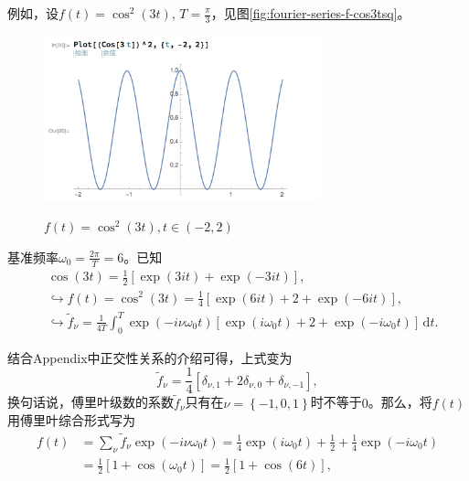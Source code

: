 例如，设$f(t) = \cos^{2} \left( 3 t \right), \, T = \frac{\pi}{3}$，见图\eqref{fig:fourier-series-f-cos3tsq}。

\begin{figure}[htbp]
   \caption{$f(t) = \cos^{2} \left( 3 t \right), t \in (-2, 2)$}
  \centering
  \includegraphics[width=8cm]{./Figures/20180305-cos3tsq.png}
  \label{fig:fourier-series-f-cos3tsq}
%
\end{figure}

基准频率$\omega_{0} = \frac{2 \pi}{T} = 6$。已知
\begin{equation}
  \label{eq:fourier-series-expo-coef}
\begin{split}
  & \cos \left( 3t \right) = \frac{1}{2} \left[
  \exp \left( 3 i t \right) + \exp \left( - 3 i t \right)
  \right], \\
  & \hookrightarrow
  f(t) = \cos^{2} (3t) = \frac{1}{4} \left[
  \exp \left( 6 i t \right) + 2 + \exp \left( - 6 i t \right)
  \right], \\
  & \hookrightarrow
  \tilde{f}_{\nu} = \frac{1}{4 T} \int_{0}^{T}
  \exp \left( -i \nu \omega_{0} t \right)
  \left[
  \exp \left( i \omega_{0} t \right) + 2
  + \exp \left( - i \omega_{0} t \right)
  \right] \, \mathrm{d} t.
\end{split}
\end{equation}

结合Appendix中正交性关系的介绍可得，上式变为
\begin{equation*}
  \tilde{f}_{\nu} = \frac{1}{4}
  \left[
  \delta_{\nu,1} + 2 \delta_{\nu,0} + \delta_{\nu,-1}
  \right],
\end{equation*}
换句话说，傅里叶级数的系数$\tilde{f}_{\nu}$只有在$\nu = \left\{ -1, 0 ,1 \right\}$时不等于$0$。那么，将$f(t)$用傅里叶综合形式写为
\begin{equation}
  \label{eq:fourier-series-expo-coef-cal}
  \begin{split}
    f(t) & = \sum_{\nu} \tilde{f}_{\nu} \exp \left( - i \nu \omega_{0} t \right) = \frac{1}{4} \exp \left(i \omega_{0} t \right) + \frac{1}{2} + \frac{1}{4} \exp \left( - i \omega_{0} t \right) \\
    & = \frac{1}{2} \left[ 1 + \cos \left( \omega_{0} t \right) \right] = \frac{1}{2} \left[ 1 + \cos \left( 6 t \right) \right],
  \end{split}
\end{equation}

